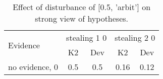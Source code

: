 \begin{table}\begin{tabular}{l|cc|cc}\toprule\multirow{2}{*}{Evidence} & \multicolumn{2}{c}{stealing 1 0}& \multicolumn{2}{c}{stealing 2 0}\\& {K2} & {Dev}& {K2} & {Dev}\\\midrule
no evidence, 0 & 0.5&0.5&0.16&0.12\\\bottomrule\end{tabular}\caption{Effect of disturbance of [0.5, 'arbit'] on strong view of hypotheses.}\end{table}